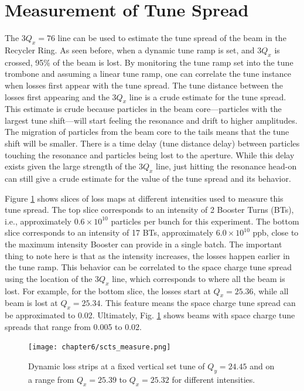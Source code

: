 \section{Measurement of Tune Spread}

The $3Q_x=76$ line can be used to estimate the tune spread of the beam in the Recycler Ring. As seen before, when a dynamic tune ramp is set, and $3Q_x$ is crossed, 95\% of the beam is lost. By monitoring the tune ramp set into the tune trombone and assuming a linear tune ramp, one can correlate the tune instance when losses first appear with the tune spread. The tune distance between the losses first appearing and the $3Q_x$ line is a crude estimate for the tune spread. This estimate is crude because particles in the beam core---particles with the largest tune shift---will start feeling the resonance and drift to higher amplitudes. The migration of particles from the beam core to the tails means that the tune shift will be smaller. There is a time delay (tune distance delay) between particles touching the resonance and particles being lost to the aperture. While this delay exists given the large strength of the $3Q_x$ line, just hitting the resonance head-on can still give a crude estimate for the value of the tune spread and its behavior.

Figure \ref{fig:dynamictunespread} shows slices of loss maps at different intensities used to measure this tune spread. The top slice corresponds to an intensity of 2 Booster Turns (BTs), i.e., approximately $0.6\times10^{10}$ particles per bunch for this experiment. The bottom slice corresponds to an intensity of 17 BTs, approximately $6.0\times10^{10}$ ppb, close to the maximum intensity Booster can provide in a single batch. The important thing to note here is that as the intensity increases, the losses happen earlier in the tune ramp. This behavior can be correlated to the space charge tune spread using the location of the $3Q_x$ line, which corresponds to where all the beam is lost. For example, for the bottom slice, the losses start at $Q_x=25.36$, while all beam is lost at $Q_x=25.34$. This feature means the space charge tune spread can be approximated to 0.02. Ultimately, Fig. \ref{fig:dynamictunespread} shows beams with space charge tune spreads that range from 0.005 to 0.02.

\newpage
\begin{figure}[H]
    \centering
    \texttt{[image: chapter6/scts\_measure.png]}
    \caption{Dynamic loss strips at a fixed vertical set tune of $Q_y=24.45$ and on a range from $Q_x=25.39$ to $Q_x=25.32$ for different intensities.}
    \label{fig:dynamictunespread}
   \vspace{-1.25em}
\end{figure}
\newpage

